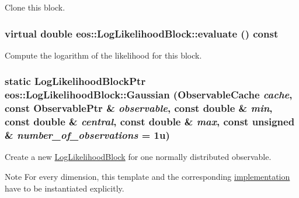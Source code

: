 Clone this block. \hypertarget{classeos_1_1LogLikelihoodBlock_a85ba7e331d03681a5f356bb2df7d1ac7}{
\subsubsection[{evaluate}]{\setlength{\rightskip}{0pt plus 5cm}virtual double eos::LogLikelihoodBlock::evaluate () const}}
\label{classeos_1_1LogLikelihoodBlock_a85ba7e331d03681a5f356bb2df7d1ac7}


Compute the logarithm of the likelihood for this block. \hypertarget{classeos_1_1LogLikelihoodBlock_a848066ee04c104fdcf0b74c868c87d68}{
\subsubsection[{Gaussian}]{\setlength{\rightskip}{0pt plus 5cm}static {\bf LogLikelihoodBlockPtr} eos::LogLikelihoodBlock::Gaussian ({\bf ObservableCache} {\em cache}, \/  const {\bf ObservablePtr} \& {\em observable}, \/  const double \& {\em min}, \/  const double \& {\em central}, \/  const double \& {\em max}, \/  const unsigned \& {\em number\_\-of\_\-observations} = {\ttfamily 1u})}}
\label{classeos_1_1LogLikelihoodBlock_a848066ee04c104fdcf0b74c868c87d68}
Create a new \hyperlink{classeos_1_1LogLikelihoodBlock}{LogLikelihoodBlock} for one normally distributed observable.

\begin{DoxyNote}{Note}
For every dimension, this template and the corresponding \hyperlink{namespaceeos_1_1implementation}{implementation} have to be instantiated explicitly.
\end{DoxyNote}

